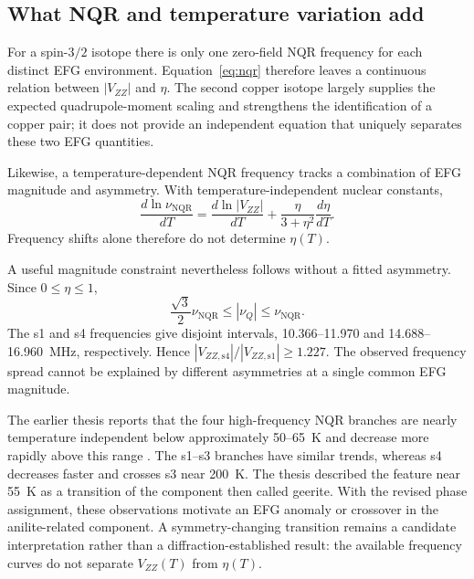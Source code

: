 \documentclass[10pt,a4paper,twocolumn]{article}
\newcommand{\nqr}{\mathrm{NQR}}
\begin{document}


\subsection{What NQR and temperature variation add}

For a spin-$3/2$ isotope there is only one zero-field NQR frequency for each distinct EFG environment. Equation~\eqref{eq:nqr} therefore leaves a continuous relation between $|V_{ZZ}|$ and $\eta$. The second copper isotope largely supplies the expected quadrupole-moment scaling and strengthens the identification of a copper pair; it does not provide an independent equation that uniquely separates these two EFG quantities.

Likewise, a temperature-dependent NQR frequency tracks a combination of EFG magnitude and asymmetry. With temperature-independent nuclear constants,
\begin{equation}
\frac{d\ln\nu_{\nqr}}{dT}
=\frac{d\ln|V_{ZZ}|}{dT}
+\frac{\eta}{3+\eta^2}\frac{d\eta}{dT}.
\label{eq:temperature}
\end{equation}
Frequency shifts alone therefore do not determine $\eta(T)$.

A useful magnitude constraint nevertheless follows without a fitted asymmetry. Since $0\leq\eta\leq1$,
\begin{equation}
\frac{\sqrt{3}}{2}\nu_{\nqr}\leq|\nu_Q|\leq\nu_{\nqr}.
\label{eq:nqrbound}
\end{equation}
The s1 and s4 frequencies give disjoint intervals, 10.366--11.970 and 14.688--16.960~MHz, respectively. Hence $|V_{ZZ,\mathrm{s4}}|/|V_{ZZ,\mathrm{s1}}|\geq1.227$. The observed frequency spread cannot be explained by different asymmetries at a single common EFG magnitude.

The earlier thesis reports that the four high-frequency NQR branches are nearly temperature independent below approximately 50--65~K and decrease more rapidly above this range \citep[pp.~23--24]{Evlampiev2009}. The s1--s3 branches have similar trends, whereas s4 decreases faster and crosses s3 near 200~K. The thesis described the feature near 55~K as a transition of the component then called geerite. With the revised phase assignment, these observations motivate an EFG anomaly or crossover in the anilite-related component. A symmetry-changing transition remains a candidate interpretation rather than a diffraction-established result: the available frequency curves do not separate $V_{ZZ}(T)$ from $\eta(T)$.
\end{document}
